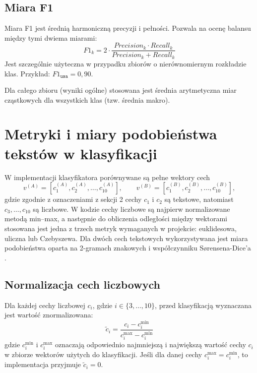 \documentclass{article}
\begin{document}
\subsection{Miara F1}
Miara F1 jest średnią harmoniczną precyzji i pełności. Pozwala na ocenę balansu między tymi dwiema miarami:
\begin{equation}
    F1_k = 2 \cdot \frac{Precision_k \cdot Recall_k}{Precision_k + Recall_k}
\end{equation}
Jest szczególnie użyteczna w przypadku zbiorów o nierównomiernym rozkładzie klas.
Przykład: $F1_{\texttt{usa}} = 0{,}90$.

Dla całego zbioru (wyniki ogólne) stosowana jest średnia arytmetyczna miar cząstkowych dla wszystkich klas (tzw. średnia makro).


\section{Metryki i miary podobieństwa tekstów w klasyfikacji}
W implementacji klasyfikatora porównywane są pełne wektory cech
\begin{equation}
    v^{(A)} = [c_1^{(A)}, c_2^{(A)}, \ldots, c_{10}^{(A)}], \qquad
    v^{(B)} = [c_1^{(B)}, c_2^{(B)}, \ldots, c_{10}^{(B)}],
\end{equation}
gdzie zgodnie z oznaczeniami z sekcji 2 cechy $c_1$ i $c_2$ są tekstowe, natomiast
$c_3,\ldots,c_{10}$ są liczbowe. W kodzie cechy liczbowe są najpierw normalizowane metodą
min--max, a następnie do obliczenia odległości między wektorami stosowana jest jedna z
trzech metryk wymaganych w projekcie: euklidesowa, uliczna lub Czebyszewa. Dla dwóch cech
tekstowych wykorzystywana jest miara podobieństwa oparta na 2-gramach znakowych i
współczynniku Sørensena-Dice'a \cite{ngram,metrics}.

\subsection{Normalizacja cech liczbowych}
Dla każdej cechy liczbowej $c_i$, gdzie $i \in \{3,\ldots,10\}$, przed klasyfikacją
wyznaczana jest wartość znormalizowana:
\begin{equation}
    \tilde{c}_i = \frac{c_i - c_i^{\min}}{c_i^{\max} - c_i^{\min}}
\end{equation}
gdzie $c_i^{\min}$ i $c_i^{\max}$ oznaczają odpowiednio najmniejszą i największą wartość
cechy $c_i$ w zbiorze wektorów użytych do klasyfikacji. Jeśli dla danej cechy
$c_i^{\max} = c_i^{\min}$, to implementacja przyjmuje $\tilde{c}_i = 0$.
\end{document}
